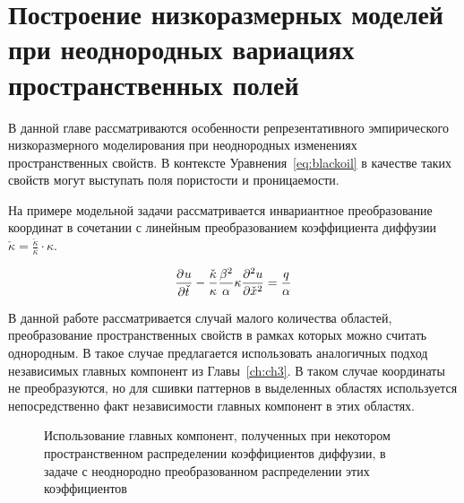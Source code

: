 \chapter{Построение низкоразмерных моделей при неоднородных вариациях пространственных полей}\label{ch:ch4}



В данной главе рассматриваются особенности репрезентативного эмпирического низкоразмерного моделирования при неоднородных изменениях пространственных свойств. В контексте Уравнения~\ref{eq:blackoil} в качестве таких свойств могут выступать поля пористости и проницаемости.

На примере модельной задачи рассматривается инвариантное преобразование координат в сочетании с линейным преобразованием коэффициента диффузии $\check{\kappa} = \frac{\check{\kappa}}{\kappa} \cdot \kappa$.

\begin{align}
    \deriv{u}{\check{t}}
    - \frac{\check{\kappa}}{\kappa}
    \frac{\beta^2}{\alpha}  \kappa \deriv[2]{u}{\check{x}} = \frac{q}{\alpha}
\end{align}

В данной работе рассматривается случай малого количества областей, преобразование пространственных свойств в рамках которых можно считать однородным. В такое случае предлагается использовать аналогичных подход независимых главных компонент из Главы~\ref{ch:ch3}. В таком случае координаты не преобразуются, но для сшивки паттернов в выделенных областях используется непосредственно факт независимости главных компонент в этих областях.

\begin{figure}[ht]
    \caption{Использование главных компонент, полученных при некотором пространственном распределении коэффициентов диффузии, в задаче с неоднородно преобразованном распределении этих коэффициентов~\cite{Elizarev2022}}\label{fig:q-domains}
\end{figure}

